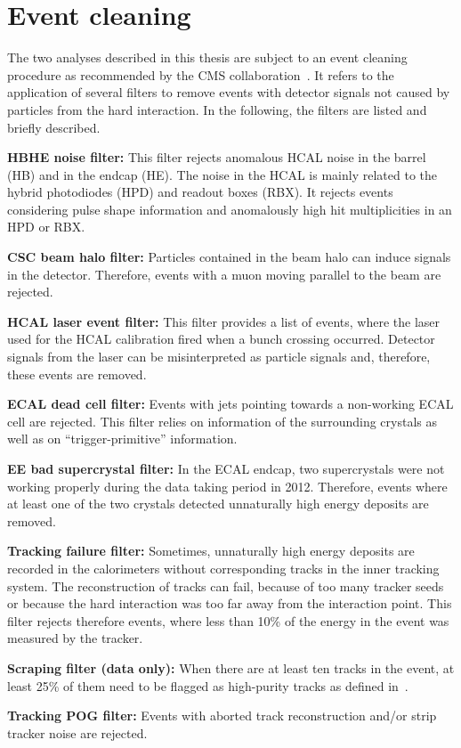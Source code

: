\section{Event cleaning}
The two analyses described in this thesis are subject to an event cleaning procedure as recommended by the CMS collaboration~\cite{bib:CMS:EventCleaning}.
It refers to the application of several filters to remove events with detector signals not caused by particles from the hard interaction. 
In the following, the filters are listed and briefly described.
\begin{description} 
\item \textbf{HBHE noise filter:} This filter rejects anomalous HCAL noise in the barrel (HB) and in the endcap (HE). 
                                  The noise in the HCAL is mainly related to the hybrid photodiodes (HPD) and readout boxes (RBX). 
                                  It rejects events considering pulse shape information and anomalously high hit multiplicities in an HPD or RBX.
\item \textbf{CSC beam halo filter:} Particles contained in the beam halo can induce signals in the detector. 
                                     Therefore, events with a muon moving parallel to the beam are rejected.  
\item \textbf{HCAL laser event filter:} This filter provides a list of events, where the laser used for the HCAL calibration fired when a bunch crossing occurred. 
                                        Detector signals from the laser can be misinterpreted as particle signals and, therefore, these events are removed.
\item \textbf{ECAL dead cell filter:} Events with jets pointing towards a non-working ECAL cell are rejected. 
                                      This filter relies on information of the surrounding crystals as well as on ``trigger-primitive'' information.
\item \textbf{EE bad supercrystal filter:} In the ECAL endcap, two supercrystals were not working properly during the data taking period in 2012. 
                                           Therefore, events where at least one of the two crystals detected unnaturally high energy deposits are removed. 
\item \textbf{Tracking failure filter:} Sometimes, unnaturally high energy deposits are recorded in the calorimeters without corresponding tracks in the inner tracking system. 
                                        The reconstruction of tracks can fail, because of too many tracker seeds or because the hard interaction was too far away from the interaction point.
                                        This filter rejects therefore events, where less than 10\% of the energy in the event was measured by the tracker.  
\item \textbf{Scraping filter (data only):} When there are at least ten tracks in the event, at least 25\% of them need to be flagged as high-purity tracks as defined in~\cite{bib:CMS:Tracking_2010}.
\item \textbf{Tracking POG filter:} Events with aborted track reconstruction and/or strip tracker noise are rejected.
\end{description}
